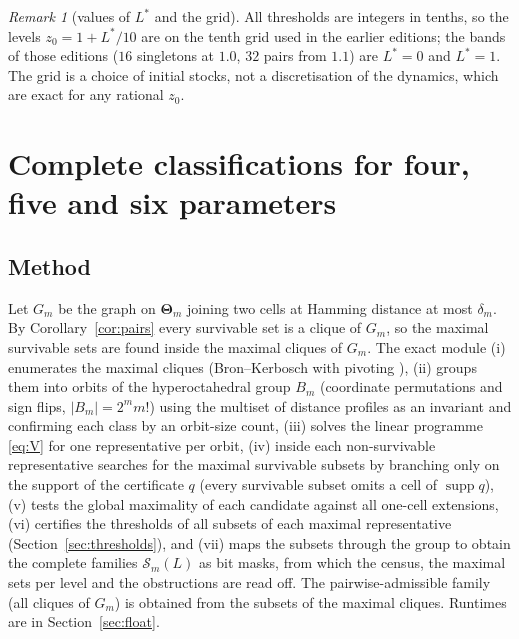 \documentclass[11pt,a4paper]{article}
\theoremstyle{plain}
\theoremstyle{definition}
\theoremstyle{remark}
\newtheorem{remark}[theorem]{Remark}
\newcommand{\calS}{\mathcal{S}}
\let\GreekTheta\Theta
\renewcommand{\Theta}{\boldsymbol{\GreekTheta}}
\newcommand{\supp}{\operatorname{supp}}
\newcommand{\Lstar}{L^{\ast}}
\begin{document}
\begin{remark}[values of $\Lstar$ and the grid]
All thresholds are integers in tenths, so the levels $z_0=1+\Lstar/10$ are on the tenth grid used in the earlier editions; the bands of those editions ($16$ singletons at $1.0$, $32$ pairs from $1.1$) are $\Lstar=0$ and $\Lstar=1$. The grid is a choice of initial stocks, not a discretisation of the dynamics, which are exact for any rational $z_0$.
\end{remark}
\section{Complete classifications for four, five and six parameters}\label{sec:classification}

\subsection{Method}
Let $G_m$ be the graph on $\Theta_m$ joining two cells at Hamming distance at most $\delta_m$. By Corollary~\ref{cor:pairs} every survivable set is a clique of $G_m$, so the maximal survivable sets are found inside the maximal cliques of $G_m$. The exact module (i) enumerates the maximal cliques (Bron--Kerbosch with pivoting \cite{BronKerbosch1973}), (ii) groups them into orbits of the hyperoctahedral group $B_m$ (coordinate permutations and sign flips, $|B_m|=2^mm!$) using the multiset of distance profiles as an invariant and confirming each class by an orbit-size count, (iii) solves the linear programme \eqref{eq:V} for one representative per orbit, (iv) inside each non-survivable representative searches for the maximal survivable subsets by branching only on the support of the certificate $q$ (every survivable subset omits a cell of $\supp q$), (v) tests the global maximality of each candidate against all one-cell extensions, (vi) certifies the thresholds of all subsets of each maximal representative (Section~\ref{sec:thresholds}), and (vii) maps the subsets through the group to obtain the complete families $\calS_m(L)$ as bit masks, from which the census, the maximal sets per level and the obstructions are read off. The pairwise-admissible family (all cliques of $G_m$) is obtained from the subsets of the maximal cliques. Runtimes are in Section~\ref{sec:float}.
\end{document}
